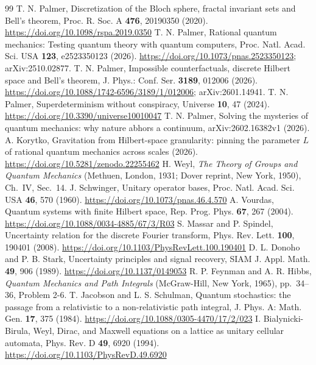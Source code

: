 \documentclass[aps,prd,twocolumn,superscriptaddress,nofootinbib]{revtex4-2}
\begin{document}
\begin{thebibliography}{99}
 T. N. Palmer, Discretization of the Bloch sphere, fractal invariant sets and Bell's theorem, Proc. R. Soc. A \textbf{476}, 20190350 (2020). \url{https://doi.org/10.1098/rspa.2019.0350}
 T. N. Palmer, Rational quantum mechanics: Testing quantum theory with quantum computers, Proc. Natl. Acad. Sci. USA \textbf{123}, e2523350123 (2026). \url{https://doi.org/10.1073/pnas.2523350123}; arXiv:2510.02877.
 T. N. Palmer, Impossible counterfactuals, discrete Hilbert space and Bell's theorem, J. Phys.: Conf. Ser. \textbf{3189}, 012006 (2026). \url{https://doi.org/10.1088/1742-6596/3189/1/012006}; arXiv:2601.14941.
 T. N. Palmer, Superdeterminism without conspiracy, Universe \textbf{10}, 47 (2024). \url{https://doi.org/10.3390/universe10010047}
 T. N. Palmer, Solving the mysteries of quantum mechanics: why nature abhors a continuum, arXiv:2602.16382v1 (2026).
 A. Korytko, Gravitation from Hilbert-space granularity: pinning the parameter $L$ of rational quantum mechanics across scales (2026). \url{https://doi.org/10.5281/zenodo.22255462}
 H. Weyl, \emph{The Theory of Groups and Quantum Mechanics} (Methuen, London, 1931; Dover reprint, New York, 1950), Ch.~IV, Sec.~14.
 J. Schwinger, Unitary operator bases, Proc. Natl. Acad. Sci. USA \textbf{46}, 570 (1960). \url{https://doi.org/10.1073/pnas.46.4.570}
 A. Vourdas, Quantum systems with finite Hilbert space, Rep. Prog. Phys. \textbf{67}, 267 (2004). \url{https://doi.org/10.1088/0034-4885/67/3/R03}
 S. Massar and P. Spindel, Uncertainty relation for the discrete Fourier transform, Phys. Rev. Lett. \textbf{100}, 190401 (2008). \url{https://doi.org/10.1103/PhysRevLett.100.190401}
 D. L. Donoho and P. B. Stark, Uncertainty principles and signal recovery, SIAM J. Appl. Math. \textbf{49}, 906 (1989). \url{https://doi.org/10.1137/0149053}
 R. P. Feynman and A. R. Hibbs, \emph{Quantum Mechanics and Path Integrals} (McGraw-Hill, New York, 1965), pp.~34--36, Problem 2-6.
 T. Jacobson and L. S. Schulman, Quantum stochastics: the passage from a relativistic to a non-relativistic path integral, J. Phys. A: Math. Gen. \textbf{17}, 375 (1984). \url{https://doi.org/10.1088/0305-4470/17/2/023}
 I. Bialynicki-Birula, Weyl, Dirac, and Maxwell equations on a lattice as unitary cellular automata, Phys. Rev. D \textbf{49}, 6920 (1994). \url{https://doi.org/10.1103/PhysRevD.49.6920}

\end{thebibliography}
\end{document}
